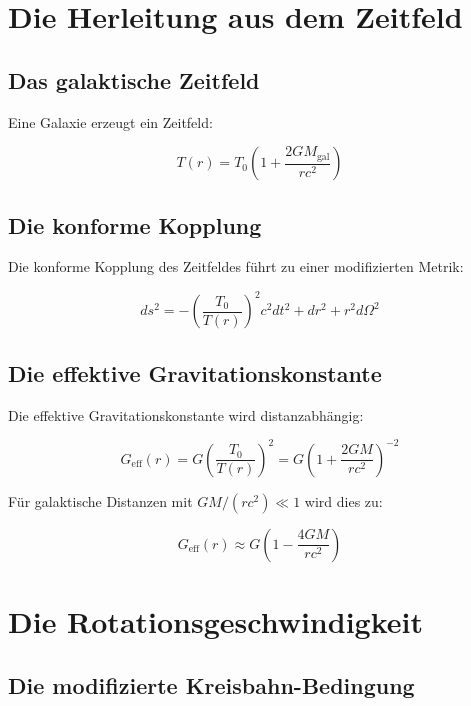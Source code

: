 \documentclass[12pt,a4paper]{report}
\begin{document}
	\section{Die Herleitung aus dem Zeitfeld}
	
	\subsection{Das galaktische Zeitfeld}
	
	Eine Galaxie erzeugt ein Zeitfeld:
	
	\begin{equation}
		T(r) = T_0\left(1 + \frac{2GM_{\text{gal}}}{rc^2}\right)
	\end{equation}
	
	\subsection{Die konforme Kopplung}
	
	Die konforme Kopplung des Zeitfeldes führt zu einer modifizierten Metrik:
	
	\begin{equation}
		ds^2 = -\left(\frac{T_0}{T(r)}\right)^2 c^2 dt^2 + dr^2 + r^2 d\Omega^2
	\end{equation}
	
	\subsection{Die effektive Gravitationskonstante}
	
	Die effektive Gravitationskonstante wird distanzabhängig:
	
	\begin{equation}
		G_{\text{eff}}(r) = G\left(\frac{T_0}{T(r)}\right)^2 = G\left(1 + \frac{2GM}{rc^2}\right)^{-2}
	\end{equation}
	
	Für galaktische Distanzen mit $GM/(rc^2) \ll 1$ wird dies zu:
	
	\begin{equation}
		G_{\text{eff}}(r) \approx G\left(1 - \frac{4GM}{rc^2}\right)
	\end{equation}
	
	\section{Die Rotationsgeschwindigkeit}
	
	\subsection{Die modifizierte Kreisbahn-Bedingung}
	
\end{document}

